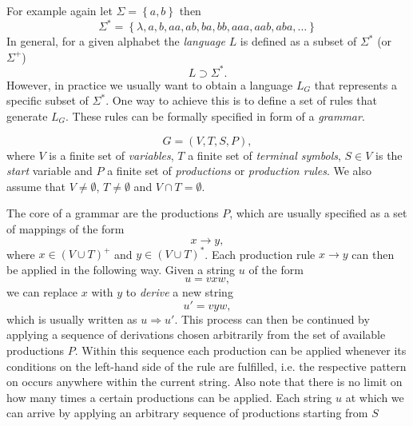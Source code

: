 For example again let $\Sigma = \left\{a, b\right\}$ then
\begin{equation*}
	\Sigma^{*} = \left\{\lambda, a, b, aa, ab, ba, bb, aaa, aab, aba, \dots \right\}
\end{equation*} 
In general, for a given alphabet the \emph{language} $L$ is defined as a subset of $\Sigma^*$ (or $\Sigma^+$)
\begin{equation}
	L \supset \Sigma^*.
	\label{eq:language-basic-definition}
\end{equation}
However, in practice we usually want to obtain a language $L_G$ that represents a specific subset of $\Sigma^*$.
One way to achieve this is to define a set of rules that generate $L_G$.
These rules can be formally specified in form of a \emph{grammar}.
\begin{definition}[Grammar]
	\begin{equation*}
		G = \left(V, T, S, P \right),
	\end{equation*}
	where $V$ is a finite set of \emph{variables},
	$T$ a finite set of \emph{terminal symbols},
	$S \in V$ is the \emph{start} variable and 
	$P$ a finite set of \emph{productions} or \emph{production rules}.
	We also assume that $V \neq \emptyset$, $T \neq \emptyset$ and $V \cap T = \emptyset$.
\end{definition}
The core of a grammar are the productions $P$, which are usually specified as a set of mappings of the form
\begin{equation}
	x \to y,
	\label{eq:unrestricted-production}
\end{equation}
where $x \in \left(V \cup T\right)^+$ and $y \in \left(V \cup T\right)^*$.
Each production rule $x \to y$ can then be applied in the following way.
Given a string $u$ of the form 
\begin{equation}
	u = vxw,
\end{equation}
we can replace $x$ with $y$ to \emph{derive} a new string
\begin{equation}
	u' = vyw,
\end{equation}
which is usually written as $u \Rightarrow u'$.
This process can then be continued by applying a sequence of derivations chosen arbitrarily from the set of available productions $P$.
Within this sequence each production can be applied whenever its conditions on the left-hand side of the rule are fulfilled, i.e. the respective pattern on occurs anywhere within the current string.
Also note that there is no limit on how many times a certain productions can be applied.
Each string $u$ at which we can arrive by applying an arbitrary sequence of productions starting from $S$
